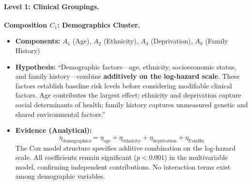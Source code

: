 \documentclass{article}
\begin{document}
\paragraph{Level 1: Clinical Groupings.}

\textbf{Composition $C_1$: Demographics Cluster.}
\begin{itemize}
    \item \textbf{Components:} $A_1$ (Age), $A_2$ (Ethnicity), $A_3$ (Deprivation), $A_9$ (Family History)
    \item \textbf{Hypothesis:} ``Demographic factors---age, ethnicity, socioeconomic status, and family history---combine \textbf{additively on the log-hazard scale}. These factors establish baseline risk levels before considering modifiable clinical factors. Age contributes the largest effect; ethnicity and deprivation capture social determinants of health; family history captures unmeasured genetic and shared environmental factors.''
    \item \textbf{Evidence (Analytical):}
    \[
    \eta_{\text{demographics}} = \eta_{\text{age}} + \eta_{\text{ethnicity}} + \eta_{\text{deprivation}} + \eta_{\text{FamHx}}
    \]
    The Cox model structure specifies additive combination on the log-hazard scale. All coefficients remain significant ($p<0.001$) in the multivariable model, confirming independent contributions. No interaction terms exist among demographic variables.
\end{itemize}
\end{document}
